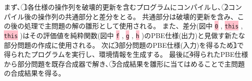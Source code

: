\documentclass[11pt, a4paper, oneside, twocolumn]{jsarticle}
\newcommand{\tightcolorbox}[2]{%
  \setlength{\fboxsep}{0.4pt}%
  \colorbox{#1}{#2}%
}
\newcommand{\mysys}{\textsc{RefSyn}}
\begin{document}
まず、\textcircled{\scriptsize 1}各仕様の操作列を破壊的更新を含むプログラムにコンパイルし、\textcircled{\scriptsize 2}コンパイル後の操作列の共通部分と差分をとる。
共通部分は破壊的更新を含み、この後の処理で主問題の解の雛形として使用される。
また、差分(図中\tightcolorbox{pink}{\texttt{0}}, \tightcolorbox{pink}{\texttt{this}}, \tightcolorbox{pink}{\texttt{this}})はその評価値を純粋関数(図中\tightcolorbox{pink}{\texttt{f}}, \tightcolorbox{pink}{\texttt{g}}, \tightcolorbox{pink}{\texttt{h}})のPBE仕様(出力)と見做す新たな部分問題の作成に使用される。
次に\textcircled{\scriptsize 3}部分問題のPBE仕様(入力)を得るため\textcircled{\scriptsize 1}で得られたプログラムを実行し、環境情報を生成する。
最後に\textcircled{\scriptsize 4}得られたPBE仕様から部分問題を既存合成器で解き、\textcircled{\scriptsize 5}合成結果を雛形に当てはめることで主問題の合成結果を得る。






\end{document}
